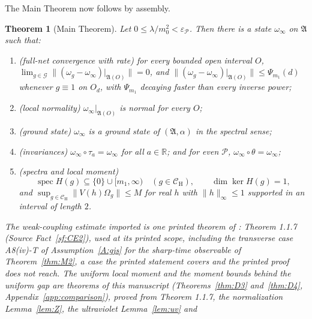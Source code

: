 \documentclass[11pt,a4paper]{article}
\theoremstyle{plain}
\newtheorem{theorem}{Theorem}[section]
\theoremstyle{definition}
\theoremstyle{plain}
\theoremstyle{definition}
\newcommand{\R}{\mathbb{R}}
\newcommand{\A}{\mathfrak{A}}
\newcommand{\G}{\mathcal{G}}
\newcommand{\CH}{\mathcal{C}_{\mathrm H}}
\newcommand{\Om}{\Omega}
\DeclareMathOperator{\spec}{spec}
\begin{document}
The Main Theorem now follows by assembly.

\begin{theorem}[Main Theorem]\label{thm:MAIN}
Let $0\le\lambda/m_0^2<\varepsilon_{\mathscr P}$. Then there is a state $\omega_\infty$ on
$\A$ such that:
\begin{enumerate}
\item[\rm(1)] \emph{(full-net convergence with rate)} for every bounded open interval $O$,
      $\lim_{g\in\G}\|(\omega_g-\omega_\infty)|_{\A(O)}\|=0$, and
      $\|(\omega_g-\omega_\infty)|_{\A(O)}\|\le\Psi_{m_1}(d)$ whenever $g\equiv1$ on $O_d$,
      with $\Psi_{m_1}$ decaying faster than every inverse power;
\item[\rm(2)] \emph{(local normality)} $\omega_\infty|_{\A(O)}$ is normal for every $O$;
\item[\rm(3)] \emph{(ground state)} $\omega_\infty$ is a ground state of $(\A,\alpha)$ in the
      spectral sense;
\item[\rm(4)] \emph{(invariances)} $\omega_\infty\circ\tau_a=\omega_\infty$ for all $a\in\R$;
      and for even $\mathscr P$, $\omega_\infty\circ\theta=\omega_\infty$;
\item[\rm(5)] \emph{(spectra and local moment)}
      \[
       \spec H(g)\subseteq\{0\}\cup[m_1,\infty)\quad(g\in\CH),
       \qquad \dim\ker H(g)=1,
      \]
      and $\sup_{g\in\CH}\|V(h)\Om_g\|\le M$ for real $h$ with $\|h\|_\infty\le1$ supported
      in an interval of length $2$.
\end{enumerate}
The weak-coupling estimate imported is one printed theorem of \cite{GJS}: Theorem 1.1.7
(Source Fact~\ref{sf:CE2}), used at its printed scope, including the transverse case
A8(iv)-T of Assumption~\ref{A:gjs} for the sharp-time observable of Theorem~\ref{thm:M2},
a case the printed statement covers and the printed proof does not reach.  The uniform
local moment and the moment bounds behind the uniform gap are theorems of this manuscript
(Theorems~\ref{thm:D3} and~\ref{thm:D4}, Appendix~\ref{app:comparison}), proved from
Theorem 1.1.7, the normalization Lemma~\ref{lem:Z}, the ultraviolet Lemma~\ref{lem:uv} and

\end{theorem}
\end{document}
